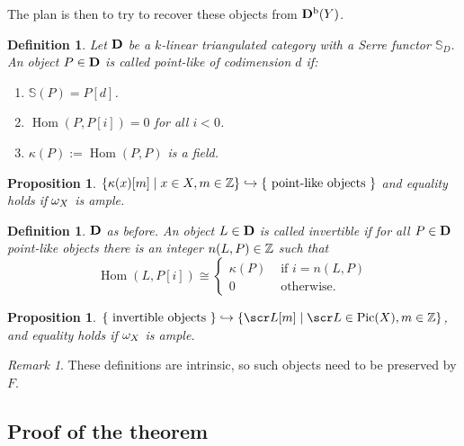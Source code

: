 \documentclass[A4paper, british]{amsart}
\theoremstyle{darkgreentheorem}
\newtheorem{prop}[thm]{Proposition}
\theoremstyle{darkbluedefinition}
\newtheorem{defn}[thm]{Definition}
\theoremstyle{darkredexample}
\theoremstyle{remark}
\newtheorem{rem}[thm]{Remark}
\DeclareMathOperator{\Hom}{Hom}
\DeclareMathOperator{\Pic}{Pic}
\renewcommand{\S}{\mathbb{S}}
\newcommand{\1}{\mathbbm{1}}
\newcommand{\mono}{\hookrightarrow}
\begin{document}
The plan is then to try to recover these objects from $\mathbf{D}^{\mathrm{b}}(Y)$.

\begin{defn}
    Let $\mathbf{D}$ be a $k$-linear triangulated category with a Serre functor $\S_{D}$.
    An object $P\in \mathbf{D}$ is called \textit{point-like} of codimension $d$ if:
    \begin{enumerate}
	\item $\S(P)=P[d]$.
	\item $\Hom(P,P[i])=0$ for all $i<0$.
	\item $\kappa(P):=\Hom(P,P)$ is a field.
    \end{enumerate}
\end{defn}

\begin{prop}
    $\{ \kappa(x)[m] \mid x\in X, m\in \Z\}\mono \{ \text{ point-like objects } \}$ and equality holds if $\omega_{X}$ is ample.
\end{prop}

\begin{defn}
    $\mathbf{D}$ as before.
    An object $L\in \mathbf{D}$ is called \textit{invertible} if for all $P\in \mathbf{D}$ point-like objects there is an integer $n(L,P)\in \mathbb{Z}$ such that
    \[ \Hom(L,P[i])\cong \begin{cases}
	\kappa(P) & \text{ if } i=n(L,P) \\
	0 & \text{ otherwise.}
    \end{cases}
    \]
\end{defn}

\begin{prop}
    $\{ \text{ invertible objects }\} \mono \{\L[m]\mid \L\in \Pic(X), m\in \Z\}$, and equality holds if $\omega_{X}$ is ample.
\end{prop}

\begin{rem}
    These definitions are intrinsic, so such objects need to be preserved by $F$.
\end{rem}

\subsection{Proof of the theorem}
\end{document}

